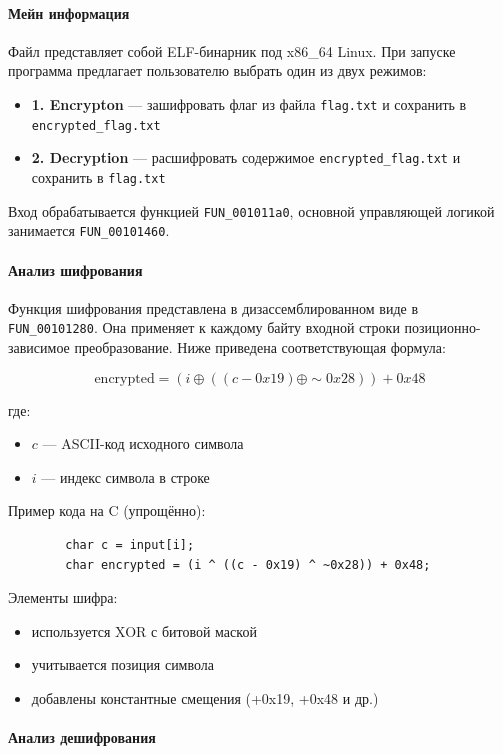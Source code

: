 \paragraph{Мейн информация}
Файл представляет собой ELF-бинарник под x86\_64 Linux.
При запуске программа предлагает пользователю выбрать один из двух режимов:
\begin{itemize}
    \item \textbf{1. Encrypton} --- зашифровать флаг из файла \texttt{flag.txt} и сохранить в \texttt{encrypted\_flag.txt}
    \item \textbf{2. Decryption} --- расшифровать содержимое \texttt{encrypted\_flag.txt} и сохранить в \texttt{flag.txt}
\end{itemize}

Вход обрабатывается функцией \texttt{FUN\_001011a0}, основной управляющей логикой занимается \texttt{FUN\_00101460}.

\paragraph{Анализ шифрования}

Функция шифрования представлена в дизассемблированном виде в \texttt{FUN\_00101280}.
Она применяет к каждому байту входной строки позиционно-зависимое преобразование.
Ниже приведена соответствующая формула:

\[
    \text{encrypted} = (i \oplus ((c - 0x19) \oplus \sim 0x28)) + 0x48
\]

где:
\begin{itemize}
    \item $c$ — ASCII-код исходного символа
    \item $i$ — индекс символа в строке
\end{itemize}

Пример кода на C (упрощённо):
\begin{verbatim}
        char c = input[i];
        char encrypted = (i ^ ((c - 0x19) ^ ~0x28)) + 0x48;
\end{verbatim}

Элементы шифра:
\begin{itemize}
    \item используется XOR с битовой маской
    \item учитывается позиция символа
    \item добавлены константные смещения (+0x19, +0x48 и др.)
\end{itemize}

\paragraph{Анализ дешифрования}

